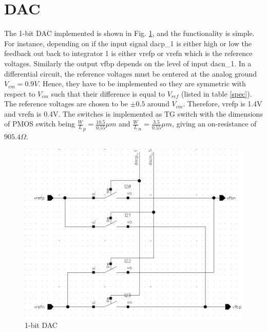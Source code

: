 \section{DAC}
The 1-bit DAC implemented is shown in Fig. \ref{DAC_block}, and the functionality is simple. For instance, depending on if the input signal dacp\_1 is either high or low the feedback out back to integrator 1 is either vrefp or vrefn which is the reference voltages. Similarly the output vfbp depends on the level of input dacn\_1. In a differential circuit, the reference voltages must be centered at the analog ground $V_{cm} = 0.9V$. Hence, they have to be implemented so they are symmetric with respect to $V_{cm}$ such that their difference is equal to $V_{ref}$ (listed in table \ref{spec}). The reference voltages are chosen to be $\pm 0.5$ around $V_{cm}$. Therefore, vrefp is 1.4V and vrefn is 0.4V. The switches is implemented as TG switch with the dimensions of PMOS switch being $\frac{W}{L}_p = \frac{10.5}{0.55}\mu m$ and $\frac{W}{L}_n = \frac{3.5}{0.55}\mu m$, giving an on-resistance of $905.4\Omega$. 

\begin{figure}[]
\centering
\includegraphics[scale = 0.45]{images/DAC_block.png}
\caption{1-bit DAC}
\label{DAC_block}
\end{figure}